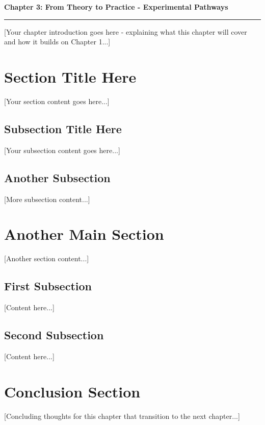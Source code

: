 \clearpage


\setcounter{chapter}{3}
\setcounter{section}{0}


\pagestyle{fancy}
\fancyhf{} %
\fancyfoot[C]{\thepage} %
\renewcommand{\headrulewidth}{0pt}
\renewcommand{\footrulewidth}{0pt}

\noindent
{\Large\textbf{Chapter 3: From Theory to Practice - Experimental Pathways}}
\vspace{0.3cm}
\hrule
\vspace{0.8cm}
\label{ch:democratization}

\setlength{\parindent}{0pt}

[Your chapter introduction goes here - explaining what this chapter will cover and how it builds on Chapter 1...]

\section{Section Title Here}

[Your section content goes here...]

\subsection{Subsection Title Here}

[Your subsection content goes here...]

\subsection{Another Subsection}

[More subsection content...]

\section{Another Main Section}

[Another section content...]

\subsection{First Subsection}

[Content here...]

\subsection{Second Subsection}

[Content here...]

\section{Conclusion Section}

[Concluding thoughts for this chapter that transition to the next chapter...]